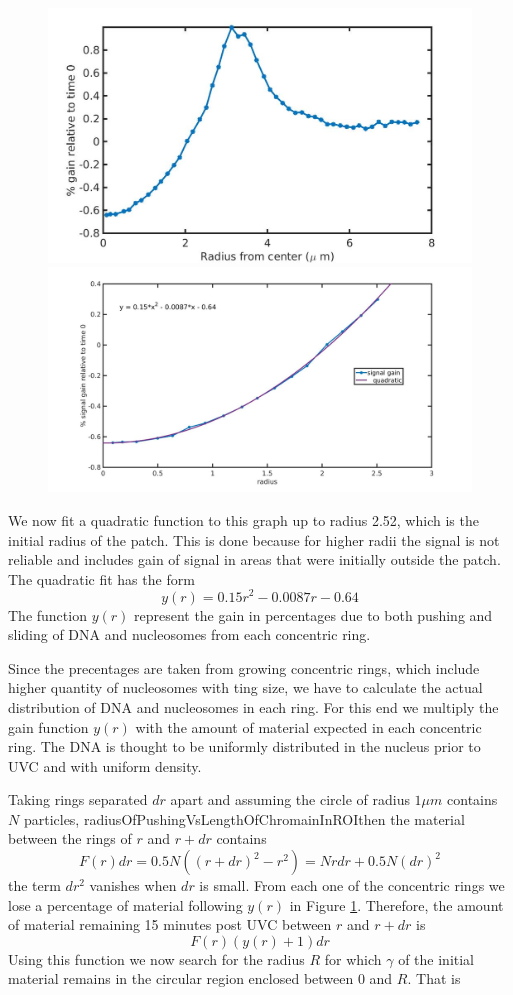 \documentclass[12pt]{report}
\begin{document}
\begin{figure}[H]
\includegraphics[width=0.5\linewidth, height=0.3\textheight]{Images/patchExpansion/relativeGainNucleosomesConcentric}
\includegraphics[width=0.5\linewidth, height=0.3\textheight]{Images/patchExpansion/nucleosomeSignalGainConcentricFit}
\caption{}
\label{fig:relativeGainNucleosomesConcentric}
\end{figure}

We now fit a quadratic function to this graph up to radius 2.52, which is the initial radius of the patch. This is done because for higher radii the signal is not reliable and includes gain of signal in areas that were initially outside the patch. The quadratic fit has the form 
\begin{equation*}
y(r)=0.15r^2-0.0087r-0.64
\end{equation*}
The function $y(r)$ represent the gain in percentages due to both pushing and sliding of DNA and nucleosomes from each concentric ring. 

Since the precentages are taken from growing concentric rings, which include higher quantity of nucleosomes with ting size, we have to calculate the actual distribution of DNA and nucleosomes in each ring. For this end we multiply the gain function $y(r)$ with the amount of material expected in each concentric ring. The DNA is thought to be uniformly distributed in the nucleus prior to UVC and with uniform density. 

Taking rings separated  $dr$ apart and assuming the circle of radius  $1 \mu m$ contains $N$ particles, radiusOfPushingVsLengthOfChromainInROIthen the material between the rings of $r$ and $r+dr$ contains  
\begin{equation*}
F(r)dr = 0.5N\left((r+dr)^2- r^2\right)=Nrdr+0.5N(dr)^2
\end{equation*}
the term $dr ^2$ vanishes when $dr$ is small.
From each one of the concentric rings we lose a percentage of material following $y(r)$ in Figure \ref{fig:relativeGainNucleosomesConcentric}. Therefore, the amount of material remaining 15 minutes post UVC between $r$ and $r+dr$ is
\begin{equation*}
F(r)(y(r)+1)dr
\end{equation*}
Using this function we now search for the radius $R$ for which $\gamma$ of the initial material remains in the circular region enclosed between 0 and $R$. That is 
\end{document}
